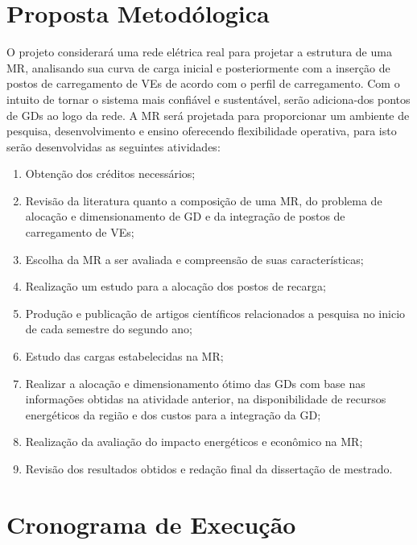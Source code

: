 \documentclass[]{IEEEphot}
\begin{document}
\section{Proposta Metodólogica}
O projeto considerará uma rede elétrica real para projetar a estrutura de uma MR, analisando sua curva de carga inicial e posteriormente com a inserção de postos de carregamento de VEs de acordo com o perfil de carregamento. Com o intuito de tornar o sistema mais confiável e sustentável, serão adiciona-dos pontos de GDs ao logo da rede. A MR será projetada para proporcionar um ambiente  de pesquisa, desenvolvimento e ensino oferecendo flexibilidade operativa, para isto serão desenvolvidas as seguintes atividades:
\begin{enumerate}
	\item Obtenção dos créditos necessários;
	\item Revisão da literatura quanto a composição de uma MR, do problema de alocação e dimensionamento de GD e da integração de postos de carregamento de VEs;
	\item Escolha da MR a ser avaliada e compreensão de suas características;
	\item Realização um estudo para a alocação dos postos de recarga;
	\item Produção e publicação de artigos científicos relacionados a pesquisa no inicio de cada semestre do segundo ano;
	\item Estudo das cargas estabelecidas na MR;
	\item Realizar a alocação e dimensionamento ótimo das GDs com base nas informações obtidas na atividade anterior, na disponibilidade de recursos energéticos da região e dos custos para a integração da GD;
	\item Realização da avaliação do impacto energéticos e econômico na MR;
	\item Revisão dos resultados obtidos e redação final da dissertação de mestrado.
\end{enumerate}
\section{Cronograma de Execução}
\nocite{*}


\end{document}
